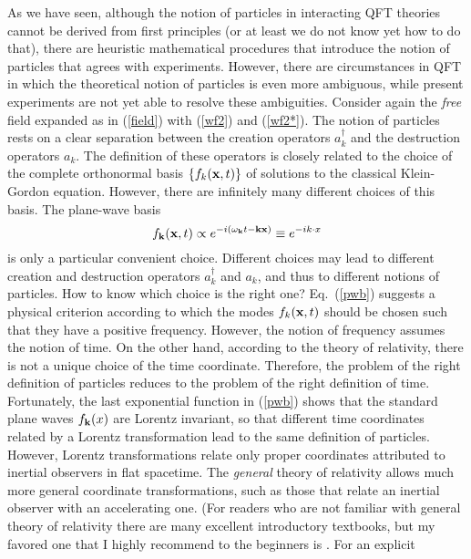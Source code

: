 \documentclass[12pt]{article}
\begin{document}
As we have seen,
although the notion of particles in interacting QFT theories 
cannot be derived from first principles (or at least 
we do not know yet how to do that), there are heuristic    
mathematical procedures that introduce the notion of particles 
that agrees with experiments. However, there are circumstances
in QFT in which the theoretical notion of particles is even more ambiguous, 
while present experiments are not yet able to resolve these ambiguities.
Consider again the {\em free} field expanded as in 
(\ref{field}) with (\ref{wf2}) and (\ref{wf2*}).  
The notion of particles rests on a clear separation
between the creation operators $a_k^{\dagger}$ and the destruction 
operators $a_k$. The definition of these operators is 
closely related to the choice of the complete orthonormal 
basis $\{ f_k({\bf x},t) \}$ of solutions to the classical 
Klein-Gordon equation. However, there are 
infinitely many different choices of this basis. 
The plane-wave basis 
\begin{equation}\label{pwb}
f_{\bf k}({\bf x},t) \propto e^{-i(\omega_{\bf k}t-{\bf k}{\bf x})}
\equiv e^{-ik\cdot x} 
\end{equation}
is only a particular convenient choice. Different choices may lead 
to different creation and destruction operators $a_k^{\dagger}$ and 
$a_k$, and thus to different notions of particles. 
How to know which choice is the right one? Eq.~(\ref{pwb}) 
suggests a physical criterion according to which 
the modes $f_k({\bf x},t)$ should be chosen such that 
they have a positive frequency. However, the notion of 
frequency assumes the notion of time. On the other hand, 
according to the theory of relativity, there is not 
a unique choice of the time coordinate. Therefore, 
the problem of the right definition of particles reduces 
to the problem of the right definition of time.
Fortunately, the last exponential function in (\ref{pwb}) shows that 
the standard plane waves $f_{\bf k}(x)$ are Lorentz invariant, 
so that different time coordinates related by a Lorentz 
transformation lead to the same definition of particles.
However, Lorentz transformations relate only proper coordinates 
attributed to inertial observers in flat spacetime.
The {\em general} theory of relativity allows much more 
general coordinate transformations, such as those that 
relate an inertial observer with an accelerating one.
(For readers who are not familiar with general 
theory of relativity there are many excellent introductory
textbooks, but my favored one that I highly recommend 
to the beginners is \cite{carrol}. For an explicit 
\end{document}
